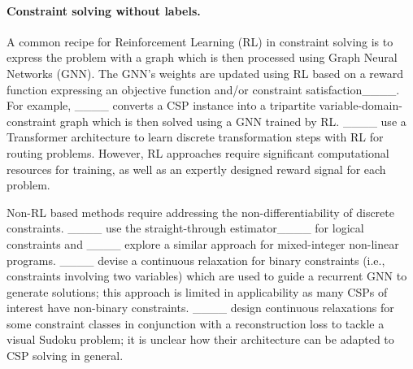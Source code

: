 \paragraph{Constraint solving without labels.}

A common recipe for Reinforcement Learning (RL) in constraint solving is to express the problem with a graph  which is then processed using Graph Neural Networks (GNN). The GNN's weights are updated using RL based on a reward function expressing an objective function and/or constraint satisfaction____. For example, ____ converts a CSP instance into a tripartite variable-domain-constraint graph which is then solved using a GNN trained by RL. ____ use a Transformer architecture to learn discrete transformation steps with RL for routing problems. However, RL approaches require significant computational resources for training, as well as an expertly designed reward signal for each problem. 




Non-RL based methods require addressing the non-differentiability of discrete constraints. ____ use the straight-through estimator____ for logical constraints and ____ explore a similar approach for mixed-integer non-linear programs. ____ devise a continuous relaxation for binary constraints (i.e., constraints involving two variables) which are used to guide a recurrent GNN to generate solutions; this approach is limited in applicability as many CSPs of interest have non-binary constraints. ____ design continuous relaxations for some constraint classes in conjunction with a reconstruction loss to tackle a visual Sudoku problem; it is unclear how their architecture can be adapted to CSP solving in general. 




